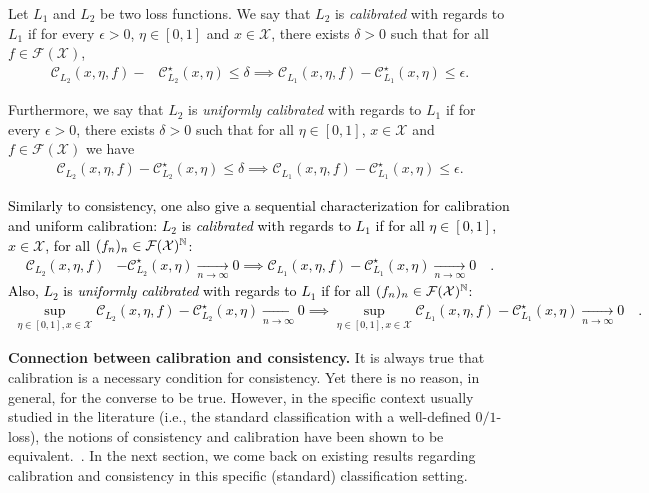 \begin{definition}[Calibration]
Let $L_1$ and $L_2$ be two loss functions. We say that $L_2$ is \emph{calibrated} with regards to $L_1$ if for every $\epsilon>0$, $\eta\in[0,1]$ and $x\in\mathcal{X}$, there exists $ \delta>0$ such that for all $f\in\mathcal{F}(\mathcal{X})$,
\begin{align*}
    \mathcal{C}_{L_2}(x,\eta,f)- &\mathcal{C}^\star_{L_2}(x,\eta)\leq\delta\implies\mathcal{C}_{L_1}(x,\eta,f)- \mathcal{C}^\star_{L_1}(x,\eta)\leq \epsilon.
\end{align*}

Furthermore, we say that $L_2$ is \emph{uniformly calibrated} with regards to $L_1$ if for every $\epsilon>0$, there exists $ \delta>0$ such that for all $\eta\in[0,1]$, $x\in\mathcal{X}$ and $f\in\mathcal{F}(\mathcal{X})$ we have
\begin{align*}
    \mathcal{C}_{L_2}(x,\eta,f)- \mathcal{C}^\star_{L_2}(x,\eta)\leq\delta\implies\mathcal{C}_{L_1}(x,\eta,f)- \mathcal{C}^\star_{L_1}(x,\eta)\leq \epsilon.
\end{align*}
\end{definition}

\textcolor{black}{
Similarly to consistency, one also give a sequential characterization for calibration and uniform calibration: $L_2$ is \emph{calibrated} with regards to $L_1$ if for all $\eta\in[0,1]$, $x\in\mathcal{X}$, for all $(f_n)_n\in\mathcal{F}(\mathcal{X})^\mathbb{N}$:
\begin{align*}
   \mathcal{C}_{L_2}(x,\eta,f)&- \mathcal{C}^\star_{L_2}(x,\eta)\xrightarrow[n\to\infty]{} 0
   \implies \mathcal{C}_{L_1}(x,\eta,f)- \mathcal{C}^\star_{L_1}(x,\eta)\xrightarrow[n\to\infty]{} 0\quad.
\end{align*}
} 
\textcolor{black}{
Also, $L_2$ is \emph{uniformly calibrated} with regards to $L_1$ if for all $(f_n)_n\in\mathcal{F}(\mathcal{X})^\mathbb{N}$:
\begin{align*}
    \sup_{\eta\in[0,1],x\in\mathcal{X}} \mathcal{C}_{L_2}(x,\eta,f)- \mathcal{C}^\star_{L_2}(x,\eta)\xrightarrow[n\to\infty]{} 0\implies\sup_{\eta\in[0,1],x\in\mathcal{X}} \mathcal{C}_{L_1}(x,\eta,f)- \mathcal{C}^\star_{L_1}(x,\eta)\xrightarrow[n\to\infty]{} 0\quad.
\end{align*} }


\textbf{Connection between calibration and consistency.}
It is always true that calibration is a necessary condition for consistency. Yet there is no reason, in general, for the converse to be true. However, in the specific context usually studied in the literature (i.e., the standard classification with a well-defined $0/1$-loss), the notions of consistency and calibration have been shown to be equivalent.~\citep{zhang2004statistical,bartlett2006convexity,steinwart2007compare}. In the next section, we come back on existing results regarding calibration and consistency in this specific (standard) classification setting. 


